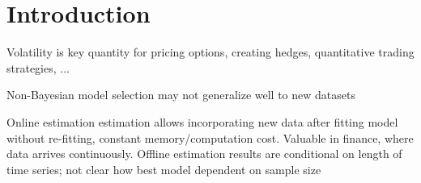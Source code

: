 \chapter{Introduction} 

Volatility is key quantity for pricing options, creating hedges, quantitative trading strategies, ...

Non-Bayesian model selection may not generalize well to new datasets

Online estimation estimation allows incorporating new data after fitting model without re-fitting, constant memory/computation cost. Valuable in finance, where data arrives continuously. Offline estimation results are conditional on length of time series; not clear how best model dependent on sample size